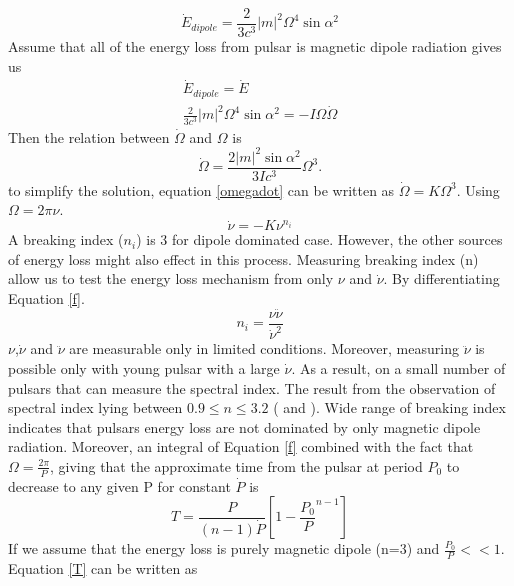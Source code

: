 \documentclass[thesis_msc.tex]{subfiles}
\begin{document}
   \begin{equation} \label{Edotdipole}
   \dot{E}_{dipole}=\frac{2}{3c^3}|m|^2\Omega^4 \sin{\alpha}^2
   \end{equation}
   Assume that all of the energy loss from pulsar is magnetic dipole radiation gives us 
   \begin{eqnarray} 
   \dot{E}_{dipole}=\dot{E}\\
   \frac{2}{3c^3}|m|^2\Omega^4 \sin{\alpha}^2=-I\Omega\dot{\Omega}
   \end{eqnarray}
   Then the relation between $\dot{\Omega}$ and $\Omega$ is
   \begin{equation} \label{omegadot}
   \dot{\Omega}=\frac{2|m|^2\sin{\alpha}^2}{3Ic^3}\Omega^3.
   \end{equation}
   to simplify the solution, equation \ref{omegadot} can be written as $\dot{\Omega}=K\Omega^3$. Using $\Omega=2\pi \nu$.
   \begin{equation} \label{f}
   \dot{\nu}=-K\nu^{n_i}
   \end{equation}
 A breaking index ($n_i$) is 3 for dipole dominated case. However, the other sources of energy loss might also effect in this process. Measuring breaking index (n) allow us to test the energy loss mechanism from only $\nu$ and $\dot{\nu}$. By differentiating Equation \ref{f}.
   \begin{equation} \label{index}
   n_i=\frac{\nu \ddot{\nu}}{\dot{\nu}^2}
   \end{equation}
    $\nu$,$\dot{\nu}$ and $\ddot{\nu}$ are measurable only in limited conditions. Moreover,  measuring  $\ddot{\nu}$ is possible only with young pulsar with a large $\dot{\nu}$.  As a result,  on a small number of pulsars that can measure the spectral index. The result from the observation of spectral index  lying between $0.9 \leq n \leq  3.2$ ( \cite{Hamil:2015hqa} and \cite{Archibald:2016hxz}). Wide range of breaking index indicates that pulsars energy loss are not dominated by only magnetic dipole radiation. Moreover, an integral of Equation \ref{f} combined with the fact that $\Omega=\frac{2\pi}{P}$, giving that the approximate time from the pulsar at period $P_0$ to decrease to any given P for constant $\dot{P}$ is
    \begin{equation} \label{T}
   T=\frac{P}{(n-1)\dot{P}}[1-\frac{P_0}{P}^{n-1}]
   \end{equation}
   If we assume that the energy loss is purely magnetic dipole (n=3) and $\frac{P_0}{P}<<1$. Equation \ref{T} can be written as  
   
\end{document}
